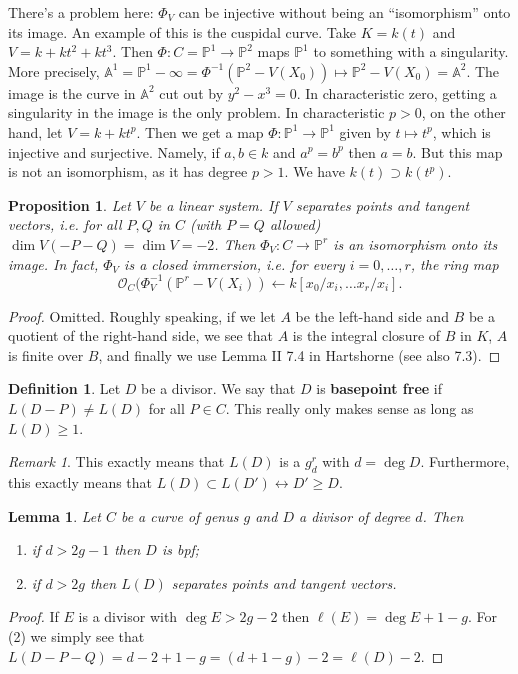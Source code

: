 \documentclass{article}
\newcommand{\Proj}{\mathbb{P}}
\theoremstyle{plain}
\newtheorem{lem}[thm]{Lemma}
\newtheorem{prop}[thm]{Proposition}
\theoremstyle{definition}
\newtheorem{defn}{Definition}
\theoremstyle{remark}
\newtheorem*{rem}{Remark}
\begin{document}
There's a problem here: $\Phi_V$ can be injective without being an ``isomorphism'' onto its image. An example of this is the cuspidal curve. Take $K=k(t)$ and $V=k+kt^2+kt^3$. Then $\Phi:C=\Proj^1\to\Proj^2$ maps $\Proj^1$ to something with a singularity. More precisely, $\mathbb{A}^1=\Proj^1-\infty=\Phi^{-1}\left(\Proj^2-V(X_0)\right)\mapsto \Proj^2-V(X_0)=\mathbb{A}^2 $.
The image is the curve in $\mathbb{A}^2$ cut out by $y^2-x^3=0$. In characteristic  zero, getting a singularity in the image is the only problem. In characteristic $p>0$, on the other hand, let $V=k+kt^p$. Then we get a map $\Phi:\Proj^1\to\Proj^1$ given by $t\mapsto t^p$, which is injective and surjective. Namely, if $a,b\in k$ and $a^p=b^p$ then $a=b$. But this map is not an isomorphism, as it has degree $p>1$. We have $k(t)\supset k(t^p)$.


\begin{prop}
\label{L108}
Let $V$ be a linear system. If $V$ separates points and tangent vectors, i.e. for all $P,Q$ in $C$ (with $P=Q$ allowed) $\dim V(-P-Q)=\dim V=-2$. Then $\Phi_V:C\to\Proj^r$ is an isomorphism onto its image. In fact, $\Phi_V$ is a closed immersion, i.e. for every $i=0,\ldots, r$, the ring map
\[\mathcal{O}_C(\Phi_V^{-1}(\Proj^r-V(X_i))\longleftarrow k[x_0/x_i,\ldots x_r/x_i].\]
\end{prop}
\begin{proof}
Omitted. Roughly speaking, if we let $A$ be the left-hand side and $B$ be a quotient of the right-hand side, we see that $A$ is the integral closure of $B$ in $K$, $A$ is finite over $B$, and finally we use Lemma II 7.4 in Hartshorne (see also 7.3).
\end{proof}


\begin{defn}
Let $D$ be a divisor. We say that $D$ is \textbf{basepoint free} if $L(D-P)\neq L(D)$ for all $P\in C$. This really only makes sense as long as $L(D)\geq 1$.
\end{defn}
\begin{rem}
This exactly means that $L(D)$ is a $g^r_d$ with $d=\deg D$. Furthermore, this exactly means that $L(D)\subset L(D')\leftrightarrow D'\geq D$.
\end{rem}

\begin{lem}
\label{L109}
Let $C$ be a curve of genus $g$ and $D$ a divisor of degree $d$. Then
\begin{enumerate}
\item if $d>2g-1$ then $D$ is bpf;
\item if $d>2g$ then $L(D)$ separates points and tangent vectors.
\end{enumerate}
\end{lem}
\begin{proof}
If $E$ is a divisor with $\deg E>2g-2$ then $\ell(E)=\deg E+1-g$. For (2) we simply see that $L(D-P-Q)=d-2+1-g=(d+1-g)-2=\ell(D)-2$.
\end{proof}
\end{document}
